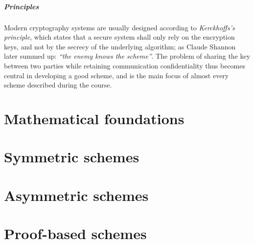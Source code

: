 \documentclass[10pt, a4paper]{report}
\theoremstyle{definition}
\theoremstyle{remark}
\begin{document}
    \subsubsection{Principles}

    Modern cryptography systems are usually designed according to \emph{Kerckhoffs's principle}, which states that a secure system  shall only rely on the encryption keys, and not by the secrecy of the underlying algorithm; as Claude Shannon later summed up: \emph{``the enemy knows the scheme''}. The problem of sharing the key between two parties while retaining communication confidentiality thus becomes central in developing a good scheme, and is the main focus of almost every scheme described during the course.

    \part{Mathematical foundations}

    
    
    
    
    

    \part{Symmetric schemes}

    
    
    
    
    
    
    

    \part{Asymmetric schemes}

    
    
    
    
    
    
    

    \part{Proof-based schemes}

    
    
    
    
    
\end{document}
